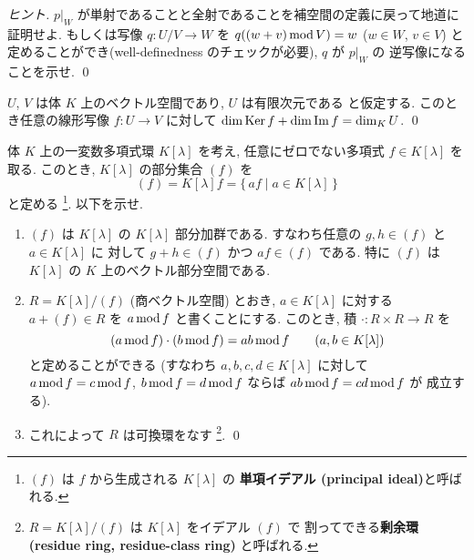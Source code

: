 \documentclass[12pt,twoside]{jarticle}
\begin{document}
\begin{proof}[ヒント]
  $p|_W$ が単射であることと全射であることを補空間の定義に戻って地道に
  証明せよ.
  もしくは写像 $q:U/V\to W$ を $q((w+v)\mathop{\mathrm{mod}}\nolimits V) = w$ ($w\in W$, $v\in V$) 
  と定めることができ(well-definedness のチェックが必要), $q$ が $p|_W$ の
  逆写像になることを示せ. \qed
\end{proof}


\begin{question}
  $U$, $V$ は体 $K$ 上のベクトル空間であり, $U$ は有限次元である
  と仮定する. このとき任意の線形写像 $f:U\to V$ に対して %
  $\dim\mathop{\mathrm{Ker}}\nolimits f + \dim\mathop{\mathrm{Im}}\nolimits f = \dim_K U$.
  \qed
\end{question}



\begin{question}[15点]
  \label{q:K[x]/(f)-1}
  体 $K$ 上の一変数多項式環 $K[\lambda]$ を考え, 
  任意にゼロでない多項式 $f\in K[\lambda]$ を取る.
  このとき, $K[\lambda]$ の部分集合 $(f)$ を
  \begin{equation*}
    (f) = K[\lambda]f = \{\, af \mid a\in K[\lambda]\,\}
  \end{equation*}
  と定める%
  \footnote{$(f)$ は $f$ から生成される $K[\lambda]$ の
    {\bf 単項イデアル (principal ideal)}と呼ばれる.}.  
  以下を示せ.
  \begin{enumerate}
  \item $(f)$ は $K[\lambda]$ の $K[\lambda]$ 部分加群である.
    すなわち任意の $g,h\in (f)$ と $a\in K[\lambda]$ に
    対して $g+h\in (f)$ かつ $af\in (f)$ である.
    特に $(f)$ は $K[\lambda]$ の $K$ 上のベクトル部分空間である.
  \item $R=K[\lambda]/(f)$ (商ベクトル空間) とおき,
    $a\in K[\lambda]$ に対する $a+(f)\in R$ を $a\mathop{\mathrm{mod}}\nolimits f$ と書くことにする.
    このとき, 積 $\cdot:R\times R\to R$ を
    \begin{equation*}
      (a\mathop{\mathrm{mod}}\nolimits f)\cdot(b\mathop{\mathrm{mod}}\nolimits f) = ab\mathop{\mathrm{mod}}\nolimits f
      \qquad (a,b\in K[\lambda])
    \end{equation*}
    と定めることができる
    (すなわち $a,b,c,d\in K[\lambda]$ に対して %
    $a\mathop{\mathrm{mod}}\nolimits f=c\mathop{\mathrm{mod}}\nolimits f$, $b\mathop{\mathrm{mod}}\nolimits f=d\mathop{\mathrm{mod}}\nolimits f$ ならば $ab\mathop{\mathrm{mod}}\nolimits f=cd\mathop{\mathrm{mod}}\nolimits f$ が
    成立する).
  \item これによって $R$ は可換環をなす%
    \footnote{$R=K[\lambda]/(f)$ は $K[\lambda]$ をイデアル $(f)$ で
      割ってできる{\bf 剰余環 (residue ring, residue-class ring)} と呼ばれる.}.
    \qed
  \end{enumerate}
\end{question}
\end{document}

